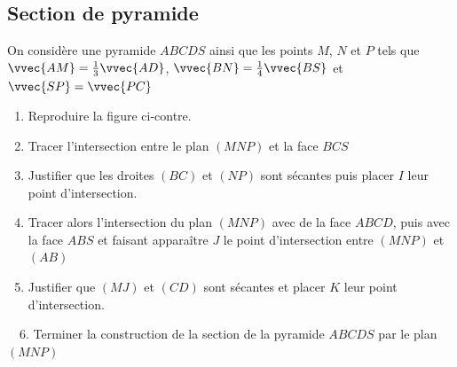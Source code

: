 \documentclass[oneside,12pt]{book}          %
\begin{document}
\subsection{Section de pyramide}
\begin{minipage}{0.65\linewidth}
On considère une pyramide $ABCDS$ ainsi que les points $M$, $N$ et $P$ tels que $\vvec{AM}=\frac{1}{3}\vvec{AD}$, $\vvec{BN}=\frac{1}{4}\vvec{BS}$ et $\vvec{SP}=\vvec{PC}$
\begin{enumerate}
	\item Reproduire la figure ci-contre.
	\item Tracer l'intersection entre le plan $(MNP)$ et la face $BCS$
	\item Justifier que les droites $(BC)$ et $(NP)$ sont sécantes puis placer $I$ leur point d'intersection.
	\item Tracer alors l'intersection du plan $(MNP)$ avec de la face $ABCD$, puis avec la face $ABS$ et faisant apparaître $J$ le point d'intersection entre $(MNP)$ et $(AB)$
	\item Justifier que $(MJ)$ et $(CD)$ sont sécantes et placer $K$ leur point d'intersection.
\end{enumerate}
\end{minipage}\hfill
\begin{minipage}{0.3\linewidth}
\end{minipage}

\quad ~\, 6. Terminer la construction de la section de la pyramide $ABCDS$ par le plan $(MNP)$
\end{document}
